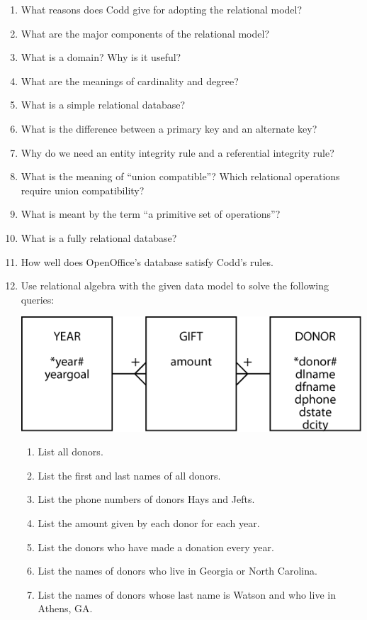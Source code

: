 \documentclass[
]{article}
\begin{document}
\begin{enumerate}
\def\labelenumi{\arabic{enumi}.}
\item
  What reasons does Codd give for adopting the relational model?
\item
  What are the major components of the relational model?
\item
  What is a domain? Why is it useful?
\item
  What are the meanings of cardinality and degree?
\item
  What is a simple relational database?
\item
  What is the difference between a primary key and an alternate key?
\item
  Why do we need an entity integrity rule and a referential integrity
  rule?
\item
  What is the meaning of ``union compatible''? Which relational
  operations require union compatibility?
\item
  What is meant by the term ``a primitive set of operations''?
\item
  What is a fully relational database?
\item
  How well does OpenOffice's database satisfy Codd's rules.
\item
  Use relational algebra with the given data model to solve the
  following queries:

  \includegraphics{Figures/Chapter 5/gift.png}

  \begin{enumerate}
  \def\labelenumii{\alph{enumii}.}
  \item
    List all donors.
  \item
    List the first and last names of all donors.
  \item
    List the phone numbers of donors Hays and Jefts.
  \item
    List the amount given by each donor for each year.
  \item
    List the donors who have made a donation every year.
  \item
    List the names of donors who live in Georgia or North Carolina.
  \item
    List the names of donors whose last name is Watson and who live
    in Athens, GA.
  \end{enumerate}
\end{enumerate}
\end{document}
